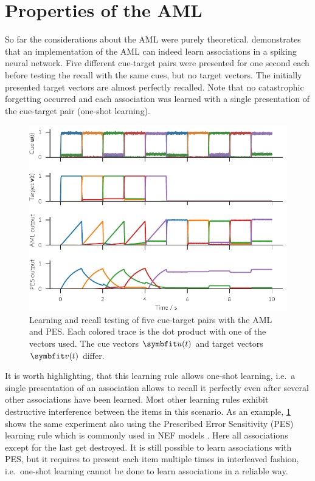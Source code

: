 \section{Properties of the AML}
So far the considerations about the AML were purely theoretical.
 demonstrates that an implementation of the AML can indeed learn associations in a spiking neural network.
Five different cue-target pairs were presented for one second each before testing the recall with the same cues, but no target vectors.
The initially presented target vectors are almost perfectly recalled.
Note that no catastrophic forgetting occurred and each association was learned with a single presentation of the cue-target pair (one-shot learning).
\begin{figure}
    \centering
    \includegraphics{figures/aml}
    \caption[Learning and recall testing of five cue-target pairs with the AML and PES]{Learning and recall testing of five cue-target pairs with the AML and PES\@. Each colored trace is the dot product with one of the vectors used. The cue vectors $\vc u(t)$ and target vectors $\vc v(t)$ differ.}\label{fig:aml}
\end{figure}

It is worth highlighting, that this learning rule allows one-shot learning, i.e.\ a single presentation of an association allows to recall it perfectly even after several other associations have been learned.
Most other learning rules exhibit destructive interference between the items in this scenario.
As an example, \cref{fig:aml} shows the same experiment also using the Prescribed Error Sensitivity (PES) learning rule \parencite{bekolay2013} which is commonly used in NEF models \parencite[e.g.,][]{komer2015,Rasmussen2017}.
Here all associations except for the last get destroyed.
It is still possible to learn associations with PES, but it requires to present each item multiple times in interleaved fashion, i.e.\ one-shot learning cannot be done to learn associations in a reliable way.

